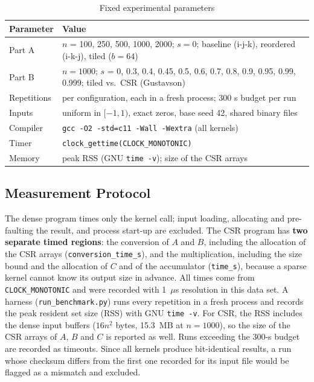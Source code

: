 \documentclass[conference,a4paper]{IEEEtran}
\newcommand{\code}[1]{\texttt{#1}}
\begin{document}
\begin{table}[t]
  \centering
  \caption{Fixed experimental parameters}
  \label{tab:parameters}
  \footnotesize
  \begin{tabular}{@{}l>{\raggedright\arraybackslash}p{}@{}}
    \toprule
    \textbf{Parameter} & \textbf{Value} \\
    \midrule
    Part A      & $n$ = 100, 250, 500, 1000, 2000; $s = 0$; baseline (i-j-k),
                  reordered (i-k-j), tiled ($b = 64$) \\
    Part B      & $n = 1000$; $s$ = 0, 0.3, 0.4, 0.45, 0.5, 0.6, 0.7, 0.8, 0.9,
                  0.95, 0.99, 0.999; tiled vs.\ CSR (Gustavson) \\
    Repetitions & 5 per configuration, each in a fresh process; 300 s budget per run \\
    Inputs      & uniform in $[-1,1)$, exact zeros, base seed 42, shared binary files \\
    Compiler    & \code{gcc -O2 -std=c11 -Wall -Wextra} (all kernels) \\
    Timer       & \code{clock\_gettime(CLOCK\_MONOTONIC)} \\
    Memory      & peak RSS (GNU \code{time -v}); size of the CSR arrays \\
    \bottomrule
  \end{tabular}
\end{table}

\subsection{Measurement Protocol}
The dense program times only the kernel call; input loading, allocating and
pre-faulting the result, and process start-up are excluded. The CSR program
has \textbf{two separate timed regions}: the conversion of $A$ and $B$,
including the allocation of the CSR arrays (\code{conversion\_time\_s}), and
the multiplication, including the size bound and the allocation of $C$ and of
the accumulator (\code{time\_s}), because a sparse kernel cannot know its output
size in advance. All times come from \code{CLOCK\_MONOTONIC} and were recorded
with 1~$\mu$s resolution in this data set.
A harness (\code{run\_benchmark.py}) runs every repetition in a fresh process
and records the peak resident set size (RSS) with GNU \code{time -v}. For CSR,
the RSS includes the dense input buffers ($16n^2$ bytes, 15.3~MB at
$n = 1000$), so the size of the CSR arrays of $A$, $B$ and $C$ is reported as
well. Runs exceeding the 300-s budget are recorded as timeouts. Since all
kernels produce bit-identical results, a run whose checksum differs from the
first one recorded for its input file would be flagged as a mismatch and
excluded.
\end{document}
